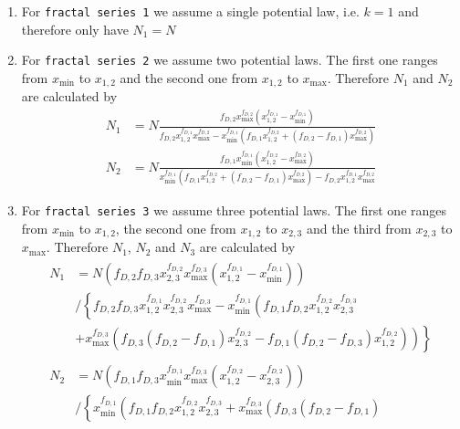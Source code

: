 \begin{enumerate}
\item For \texttt{fractal series 1} we assume a single potential law, i.e. $k=1$ and therefore only have $N_1=N$
\item For \texttt{fractal series 2} we assume two potential laws. The first one ranges from $x_\mathrm{min}$ to $x_{1,2}$ and the second one from $x_{1,2}$ to $x_\mathrm{max}$. Therefore $N_1$ and $N_2$ are calculated by
\begin{align}
    N_1 &= N \frac{f_{D,2} x_\mathrm{max}^{f_{D,2}}
   \left(x_{1,2}^{f_{D,1}}-x_\mathrm{min}^{f_{D,1}}\right)}{f_{D,2}
   x_{1,2}^{f_{D,1}} x_\mathrm{max}^{f_{D,2}}-x_\mathrm{min}^{f_{D,1}} \left(f_{D,1}
   x_{1,2}^{f_{D,2}}+(f_{D,2}-f_{D,1}) x_\mathrm{max}^{f_{D,2}}\right)}\\
    N_2 &= N \frac{f_{D,1} x_\mathrm{min}^{f_{D,1}}
   \left(x_{1,2}^{f_{D,2}}-x_\mathrm{max}^{f_{D,2}}\right)}{x_\mathrm{min}^{f_{D,1}}
   \left(f_{D,1} x_{1,2}^{f_{D,2}}+(f_{D,2}-f_{D,1})
   x_\mathrm{max}^{f_{D,2}}\right)-f_{D,2} x_{1,2}^{f_{D,1}} x_\mathrm{max}^{f_{D,2}}}
\end{align}
\item For \texttt{fractal series 3} we assume three potential laws. The first one ranges from $x_\mathrm{min}$ to $x_{1,2}$, the second one from $x_{1,2}$ to $x_{2,3}$ and the third from $x_{2,3}$ to $x_\mathrm{max}$. Therefore $N_1$, $N_2$ and $N_3$ are calculated by
\begin{align}
\begin{split}
    N_1 &= N \left(f_{D,2} f_{D,3}x_{2,3}^{f_{D,2}} x_\mathrm{max}^{f_{D,3}}
   \left(x_{1,2}^{f_{D,1}}-x_\mathrm{min}^{f_{D,1}}\right)\right) \\
   &/  \left\{ f_{D,2} f_{D,3}
  x_{1,2}^{f_{D,1}}x_{2,3}^{f_{D,2}}
   x_\mathrm{max}^{f_{D,3}} -x_\mathrm{min}^{f_{D,1}} \left(f_{D,1} f_{D,2}
  x_{1,2}^{f_{D,2}}x_{2,3}^{f_{D,3}} \right. \right.\\
  & \left. \left.+x_\mathrm{max}^{f_{D,3}} \left(f_{D,3}
   (f_{D,2}-f_{D,1})x_{2,3}^{f_{D,2}}-f_{D,1} (f_{D,2}-f_{D,3})
  x_{1,2}^{f_{D,2}}\right)\right)\right\}
\end{split}\\
\begin{split}
    N_2 &= N \left( f_{D,1} f_{D,3} x_\mathrm{min}^{f_{D,1}} x_\mathrm{max}^{f_{D,3}}
   \left(x_{1,2}^{f_{D,2}}-x_{2,3}^{f_{D,2}}\right)\right) \\
   & / \left\{ x_\mathrm{min}^{f_{D,1}}
   \left(f_{D,1} f_{D,2}x_{1,2}^{f_{D,2}}
  x_{2,3}^{f_{D,3}}+x_\mathrm{max}^{f_{D,3}} \left(f_{D,3} (f_{D,2}-f_{D,1})

\end{split}
\end{align}
\end{enumerate}
